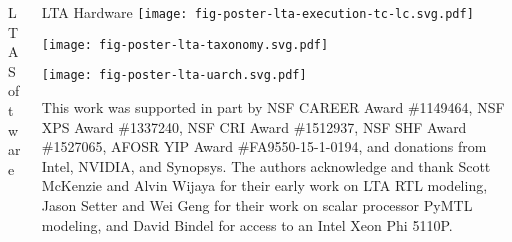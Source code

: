 \documentclass{cbxposter}
\renewcommand{\smallskip}{\vspace{0.16667in}}
\begin{document}
\begin{frame}[fragile,t]{}
\begin{columns}[T]
\begin{column}{10.5in}
\begin{block}{LTA Software}
    \smallskip

\end{block}
\end{column}


\begin{column}{10.5in}


\begin{block}{LTA Hardware}
  \vspace{-0.1in}
  \texttt{[image: fig-poster-lta-execution-tc-lc.svg.pdf]}

  \texttt{[image: fig-poster-lta-taxonomy.svg.pdf]}

  \texttt{[image: fig-poster-lta-uarch.svg.pdf]}

\end{block}



  \vspace{0.25in}

  This work was supported in part by NSF CAREER Award \#1149464, NSF XPS
  Award \#1337240, NSF CRI Award \#1512937, NSF SHF Award \#1527065,
  AFOSR YIP Award \#FA9550-15-1-0194, and donations from Intel, NVIDIA,
  and Synopsys. The authors acknowledge and thank Scott McKenzie and
  Alvin Wijaya for their early work on LTA RTL modeling, Jason Setter and
  Wei Geng for their work on scalar processor PyMTL modeling, and David
  Bindel for access to an Intel Xeon Phi 5110P.


\end{column}


\end{columns}
\end{frame}
\end{document}
